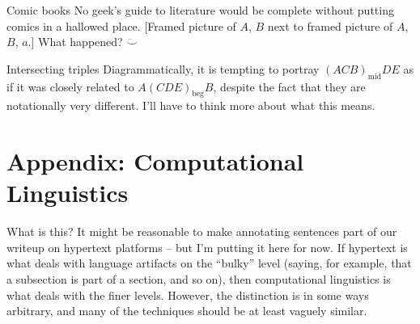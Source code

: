 \begin{notate}{Comic books}
No geek's guide to literature would be complete without
putting comics in a hallowed place.  [Framed picture of
  $A$, $B$ next to framed
  picture of $A$, $B$, $a$.]  What happened?
  $\ddot{\smile}$
\end{notate}

\begin{notate}{Intersecting triples}
Diagrammatically, it is tempting to portray
$(ACB)_{\mathrm{mid}}DE$ as if it was closely related to
$A(CDE)_{\mathrm{beg}}B$, despite the fact that they are
notationally very different.  I'll have to think more
about what this means.
\end{notate}

\section{Appendix: Computational Linguistics} \label{appendix-linguistics}

\begin{notate}{What is this?}
It might be reasonable to make annotating sentences part
of our writeup on hypertext platforms -- but I'm putting
it here for now.  If hypertext is what deals with language
artifacts on the ``bulky'' level (saying, for example,
that a subsection is part of a section, and so on), then
computational linguistics is what deals with the finer
levels.  However, the distinction is in some ways
arbitrary, and many of the techniques should be at least
vaguely similar.
\end{notate}

